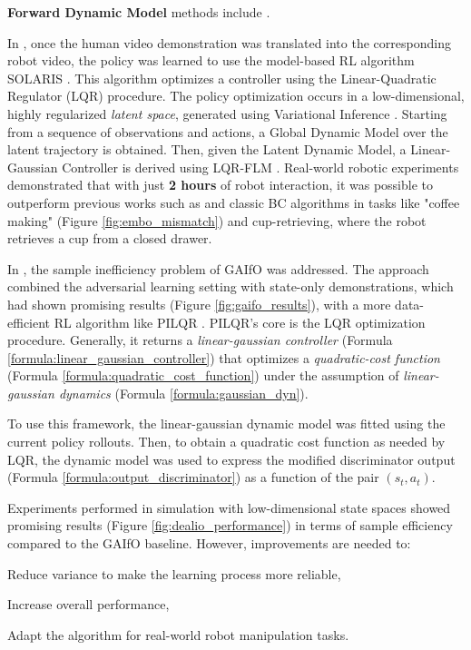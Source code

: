 

\textbf{Forward Dynamic Model} methods include \cite{smith2019avid,torabi2021dealio}.

In \cite{smith2019avid}, once the human video demonstration was translated into the corresponding robot video, the policy was learned to use the model-based RL algorithm SOLARIS \cite{zhang2019solar}. This algorithm optimizes a controller using the Linear-Quadratic Regulator (LQR) procedure. The policy optimization occurs in a low-dimensional, highly regularized \textit{latent space}, generated using Variational Inference \cite{Kingma2014_vae}. Starting from a sequence of observations and actions, a Global Dynamic Model over the latent trajectory is obtained. Then, given the Latent Dynamic Model, a Linear-Gaussian Controller is derived using LQR-FLM \cite{levine2014lqr_flm}. Real-world robotic experiments demonstrated that with just \textbf{2 hours} of robot interaction, it was possible to outperform previous works such as \cite{sermanet2018time_contrastive,torabi2018bco} and classic BC algorithms in tasks like "coffee making" (Figure \ref{fig:embo_mismatch}) and cup-retrieving, where the robot retrieves a cup from a closed drawer.

In \cite{torabi2021dealio}, the sample inefficiency problem of GAIfO \cite{torabi2018gaifo} was addressed. The approach combined the adversarial learning setting with state-only demonstrations, which had shown promising results (Figure \ref{fig:gaifo_results}), with a more data-efficient RL algorithm like PILQR \cite{chebotar2017pilqr}. PILQR's core is the LQR optimization procedure. Generally, it returns a \textit{linear-gaussian controller} (Formula \ref{formula:linear_gaussian_controller}) that optimizes a \textit{quadratic-cost function} (Formula \ref{formula:quadratic_cost_function}) under the assumption of \textit{linear-gaussian dynamics} (Formula \ref{formula:gaussian_dyn}).



To use this framework, the linear-gaussian dynamic model was fitted using the current policy rollouts. Then, to obtain a quadratic cost function as needed by LQR, the dynamic model was used to express the modified discriminator output (Formula \ref{formula:output_discriminator}) as a function of the pair $(s_{t}, a_{t})$.



Experiments performed in simulation with low-dimensional state spaces showed promising results (Figure \ref{fig:dealio_performance}) in terms of sample efficiency compared to the GAIfO baseline. However, improvements are needed to:
\begin{enumerate*}[label=\textbf{(\arabic*)}]
    \item Reduce variance to make the learning process more reliable,
    \item Increase overall performance,
    \item Adapt the algorithm for real-world robot manipulation tasks.
\end{enumerate*}

